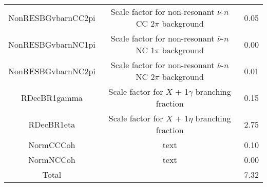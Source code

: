 \documentclass[../main.tex]{subfiles}
\begin{document}
\begin{table}[H]
{\begin{tabular}{ c c c }
    NonRESBGvbarnCC2pi & Scale factor for non-resonant $\bar{\nu}$-$n$ CC 2$\pi$ background & 0.05 \\
    NonRESBGvbarnNC1pi & Scale factor for non-resonant $\bar{\nu}$-$n$ NC 1$\pi$ background & 0.00 \\
    NonRESBGvbarnNC2pi & Scale factor for non-resonant $\bar{\nu}$-$n$ NC 2$\pi$ background  & 0.01 \\
    RDecBR1gamma & Scale factor for $X$ + 1$\gamma$ branching fraction & 0.15 \\
    RDecBR1eta & Scale factor for $X$ + 1$\eta$ branching fraction & 2.75 \\
    NormCCCoh & text & 0.10 \\
    NormNCCoh & text & 0.00 \\
    \hline
    Total & & 7.32 \\
    \hline
    \end{tabular}}
    \label{Tab:xsecparameters_multisigma}
\end{table}
\end{document}
